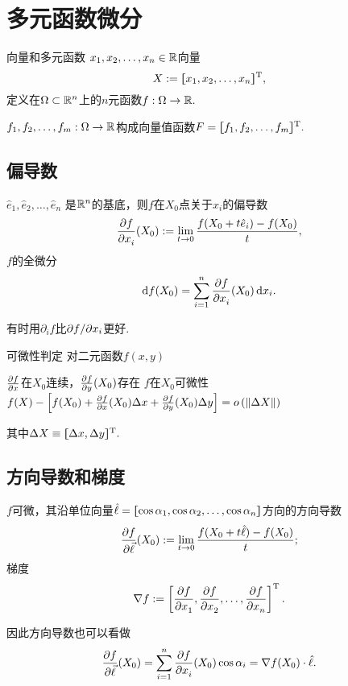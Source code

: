 \def\coursename{微积分}
\def\coursefullname{多元微积分与级数}
\def\courseEnglishname{Multivariate Calculus and Series}
\def\beginday{2021/3/31}
\def\Def{\paragraph*{定义}}
\def\The{\paragraph*{定理}}





\firstandforemost

\section{多元函数微分}
\begin{definition}{向量和多元函数}{}
	$x_1,x_2,\ldots,x_n\in\mathbb R$向量
	\[X:=\lfloor\hspace{-4.7 pt}\lceil x_1,x_2,\ldots,x_n\rceil\hspace{-4.7 pt}\rfloor^{\mathrm T},\]
	定义在$\Omega\subset\mathbb R^n$上的$n$元函数$f:\Omega\to\mathbb R.$
\end{definition}
$f_1,f_2,\ldots,f_m:\Omega\to\mathbb R$构成向量值函数$F=\lfloor\hspace{-4.7 pt}\lceil f_1,f_2,\ldots,f_m\rceil\hspace{-4.7 pt}\rfloor^{\mathrm T}.$
\subsection{偏导数}
\begin{definition}{}{}
	$\hat e_1,\hat e_2,\ldots,\hat e_n$ 是$\mathbb R^n$的基底，则$f$在$X_0$点关于$x_i$的偏导数
	\[\frac{\partial^{\;\!\!}f}{\partial x_i^{\;\!\!}}(X_0):=\lim_{t\to 0}\frac{f(X_0+t\hat e_i)-f(X_0)}t,\]
	$f$的全微分
	\begin{align}
		\mathop{}\!\mathrm{d} f(X_0)=\sum_{i=1}^n\frac{\partial^{\;\!\!}f}{\partial x_i^{\;\!\!}}(X_0)\mathop{}\!\mathrm{d} x_i.
	\end{align}
\end{definition}
有时用$\partial_if$比$\partial f/\partial x_i$更好.
\begin{theorem}{可微性判定}{}
	对二元函数$f(x,y)$
	\begin{center}
		$\frac{\partial^{\;\!\!}f}{\partial x^{\;\!\!}}$在$X_0$连续，$\frac{\partial^{\;\!\!}f}{\partial y^{\;\!\!}}(X_0)$存在
		\vthus
		$f$在$X_0$可微性
		\viff
		$f(X)-\fkh{f(X_0)+\pv fx(X_0)\Delta x+\pv fy(X_0)\Delta y}=o\kh{\norm{\Delta X}}$
	\end{center}
	其中$\Delta X\equiv\lfloor\hspace{-4.7 pt}\lceil \Delta x,\Delta y\rceil\hspace{-4.7 pt}\rfloor^{\mathrm T}.$
\end{theorem}
\subsection{方向导数和梯度}
\begin{definition}{}{}
	$f$可微，其沿单位向量$\hat \ell=\lfloor\hspace{-4.7 pt}\lceil \cos\alpha_1,\cos\alpha_2,\ldots,\cos\alpha_n\rceil\hspace{-4.7 pt}\rfloor$方向的方向导数 %
	\[\frac{\partial^{\;\!\!}f}{\partial \vec \ell^{\;\!\!}}(X_0):=\lim_{t\to 0}\frac{f(X_0+t\hat \ell)-f(X_0)}t;\]
	梯度
	\[\nabla f:=\left[\pv f{x_1},\pv f{x_2},\ldots,\pv f{x_n}\right]\tp.\]
\end{definition}
因此方向导数也可以看做
\begin{align}
	\pv f{\vec \ell}(X_0)=\sum_{i=1}^n\pv f{x_i}(X_0)\cos\alpha_i=\nabla f(X_0)\cdot\hat \ell.
\end{align}
